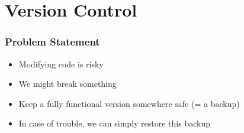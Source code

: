 
\section{Version Control}

\begin{frame}
  \tableofcontents[currentsection]
\end{frame}

\begin{frame}
  \frametitle{Problem Statement}
  \begin{itemize}
    \item Modifying code is risky
    \item We might break something
    \item Keep a fully functional version somewhere safe (= a backup)
    \item In case of trouble, we can simply restore this backup
  \end{itemize}
\end{frame}

